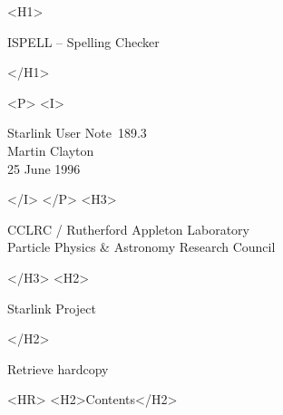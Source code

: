\documentclass[twoside,11pt]{article}
\newcommand{\stardoccategory}  {Starlink User Note}
\newcommand{\stardocsource}    {sun\stardocnumber}
\newcommand{\stardocnumber}    {189.3}
\newcommand{\stardocauthors}   {Martin Clayton}
\newcommand{\stardocdate}      {25 June 1996}
\newcommand{\stardoctitle}     {ISPELL \sunspec{--}{-} Spelling Checker}
\newcommand{\htmladdnormallink}[2]{#1}
\newcommand{\htmladdimg}[1]{}
\newcommand{\htmlref}[2]{#1}
\newcommand{\htmladdtonavigation}[1]{}
\newcommand{\xlabel}[1]{}
\newcommand{\sunspec}[2]{#1}
\newcommand{\sunspec}[2]{#2}
\begin{document}
\begin{htmlonly}
   \xlabel{}
   \begin{rawhtml} <H1> \end{rawhtml}
      \stardoctitle
   \begin{rawhtml} </H1> \end{rawhtml}

   \begin{figure}[h]
   \epsfysize=100mm
   \end{figure}

   \begin{rawhtml} <P> <I> \end{rawhtml}
   \stardoccategory\ \stardocnumber \\
   \stardocauthors \\
   \stardocdate
   \begin{rawhtml} </I> </P> <H3> \end{rawhtml}
      \htmladdnormallink{CCLRC}{http://www.cclrc.ac.uk} /
      \htmladdnormallink{Rutherford Appleton Laboratory}
                        {http://www.cclrc.ac.uk/ral} \\
      \htmladdnormallink{Particle Physics \& Astronomy Research Council}
                        {http://www.pparc.ac.uk} \\
   \begin{rawhtml} </H3> <H2> \end{rawhtml}
      \htmladdnormallink{Starlink Project}{http://www.starlink.ac.uk/}
   \begin{rawhtml} </H2> \end{rawhtml}
   \htmladdnormallink{\htmladdimg{source.gif} Retrieve hardcopy}
      {http://www.starlink.ac.uk/cgi-bin/hcserver?\stardocsource}\\

  \label{stardoccontents}
  \begin{rawhtml} 
    <HR>
    <H2>Contents</H2>
  \end{rawhtml}
  \htmladdtonavigation{\htmlref{\htmladdimg{contents_motif.gif}}
        {stardoccontents}}

\end{htmlonly}
\end{document}
